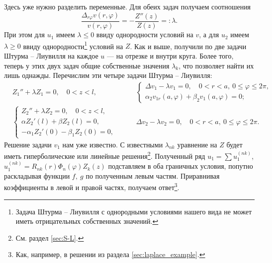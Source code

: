 Здесь уже нужно разделить переменные. Для обеих задач получаем
соотношения
\[
  \frac{\Delta_{r\varphi} v(r, \varphi)}{v(r,\varphi)} = - \frac{Z''(z)}{Z(z)}
  =: \lambda.
\]
При этом для $ u_1 $ имеем $ \lambda \leqslant 0 $ ввиду однородности условий на $ v $,
а для $ u_2 $ имеем $ \lambda \geqslant 0 $ ввиду однородности\footnote{Задача
Штурма -- Лиувилля с однородными условиями нашего вида не может иметь
отрицательных собственных значений.} условий на $ Z $. Как и выше, получили по две задачи Штурма -- Лиувилля на каждое $ u $ --- на
отрезке и внутри круга. Более того, теперь у этих двух задач общие собственные
значения $ \lambda_k $, что позволяет найти их лишь однажды.
Перечислим эти четыре задачи Штурма -- Лиувилля: 
\begin{align*}
    &Z_1'' + \lambda Z_1 = 0, \quad 0 < z < l,
  &\begin{cases}
    \Delta v_1 - \lambda v_1 = 0, \quad 0 < r < a, \ 0 \leqslant \varphi \leqslant
    2\pi,\\
    \alpha_2 v_{1r}(a,\varphi) + \beta_2 v_1(a,\varphi) = 0;
  \end{cases} \\
  &\begin{cases}
    Z_2'' + \lambda Z_2 = 0, \quad 0 < z < l,\\
    \alpha Z_2'(l) + \beta Z_2(l) = 0,\\
    -\alpha_1Z_2'(0) -\beta_1 Z_2(0) = 0,
  \end{cases} \qquad
    &\Delta v_2 - \lambda v_2 = 0, \quad 0 < r < a, \ 0 \leqslant \varphi \leqslant
    2\pi.
\end{align*}
Решение задачи $ v_1 $ нам уже известно. С известными $ \lambda_{nk} $ уравнение на $ Z $ будет иметь
гиперболические или линейные решения\footnote{См. раздел \ref{sec:S-L}.}.
Полученный ряд $ u_1 = \sum u_1^{(nk)} $, $ u_1^{(nk)} =
R_{nk}(r)\Phi_{n}(\varphi)Z_{k}(z)$
подставляем в оба граничных условия, попутно раскладывая функции $ f, \ g $ по
полученным левым частям. Приравнивая коэффициенты в левой и правой частях, получаем
ответ\footnote{Как, например, в решении из раздела
\ref{sec:laplace_example}.}.

